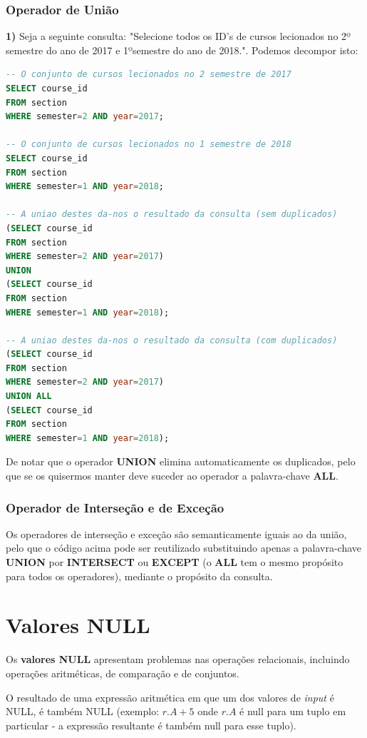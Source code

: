 \documentclass[oneside]{book}
\theoremstyle{definition}
\begin{document}
\subsubsection{Operador de União}
\textbf{1)} Seja a seguinte consulta: "Selecione todos os ID's de cursos lecionados no 2º semestre do ano de 2017 e 1ºsemestre do ano de 2018.". Podemos decompor isto:
\begin{lstlisting}[language=SQL, morekeywords={REFERENCES, REFRESH, MATERIALIZED, CONCURRENTLY}, framesep=8pt, xleftmargin=40pt, framexleftmargin=40pt, frame=tb, framerule=0pt]
-- O conjunto de cursos lecionados no 2 semestre de 2017
SELECT course_id
FROM section
WHERE semester=2 AND year=2017;

-- O conjunto de cursos lecionados no 1 semestre de 2018
SELECT course_id
FROM section
WHERE semester=1 AND year=2018;

-- A uniao destes da-nos o resultado da consulta (sem duplicados)
(SELECT course_id
FROM section
WHERE semester=2 AND year=2017)
UNION
(SELECT course_id
FROM section
WHERE semester=1 AND year=2018);

-- A uniao destes da-nos o resultado da consulta (com duplicados)
(SELECT course_id
FROM section
WHERE semester=2 AND year=2017)
UNION ALL
(SELECT course_id
FROM section
WHERE semester=1 AND year=2018);
\end{lstlisting}

De notar que o operador \textbf{UNION} elimina automaticamente os duplicados, pelo que se os quisermos manter deve suceder ao operador a palavra-chave \textbf{ALL}.

\subsubsection{Operador de Interseção e de Exceção}
Os operadores de interseção e exceção são semanticamente iguais ao da união, pelo que o código acima pode ser reutilizado substituindo apenas a palavra-chave \textbf{UNION} por \textbf{INTERSECT} ou \textbf{EXCEPT} (o \textbf{ALL} tem o mesmo propósito para todos os operadores), mediante o propósito da consulta.

\section{Valores NULL}
Os \textbf{valores NULL} apresentam problemas nas operações relacionais, incluindo operações aritméticas, de comparação e de conjuntos.

O resultado de uma expressão aritmética em que um dos valores de \textit{input} é NULL, é também NULL (exemplo: $r.A + 5$ onde $r.A$ é null para um tuplo em particular - a expressão resultante é também null para esse tuplo).
\end{document}
